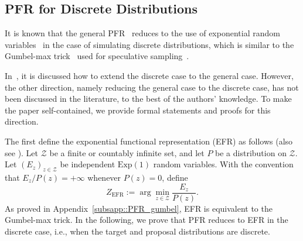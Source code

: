 \documentclass{article}
\theoremstyle{plain}
\theoremstyle{definition}
\begin{document}
\subsection{PFR for Discrete Distributions}
\label{subapp:PFR_discrete}

It is known that the general PFR~\citep{li2018strong, li2021unified} reduces to the use of exponential random variables~\citep{li2018strong, liu2025one} in the case of simulating discrete distributions, which is similar to the Gumbel-max trick~\citep{gumbel1954statistical} used for speculative sampling~\citep{kobus2025speculative}.

In~\citep{li2024channel}, it is discussed how to extend the discrete case to the general case. However, the other direction, namely reducing the general case to the discrete case, has not been discussed in the literature, to the best of the authors' knowledge.
To make the paper self-contained, we provide formal statements and proofs for this direction.


The first define the exponential functional representation (EFR) as follows (also see \citep{li2018strong, liu2025one}). 
Let $\mathcal{Z}$ be a finite or countably infinite set, and let $P$ be a distribution on $\mathcal{Z}$. 
Let $(E_z)_{z\in\mathcal{Z}}$ be independent $\mathrm{Exp}(1)$ random variables. 
With the convention that $E_z/P(z)=+\infty$ whenever $P(z)=0$, define
\begin{equation}
    Z_{\mathrm{EFR}}
    :=
    \arg\min_{z\in\mathcal{Z}} \frac{E_z}{P(z)} .
    \label{eq:EFR}
\end{equation}
As proved in Appendix~\ref{subsapp::PFR_gumbel}, EFR is equivalent to the Gumbel-max trick.
In the following, we prove that PFR reduces to EFR in the discrete case, i.e., when the target and proposal distributions are discrete. 
\end{document}
